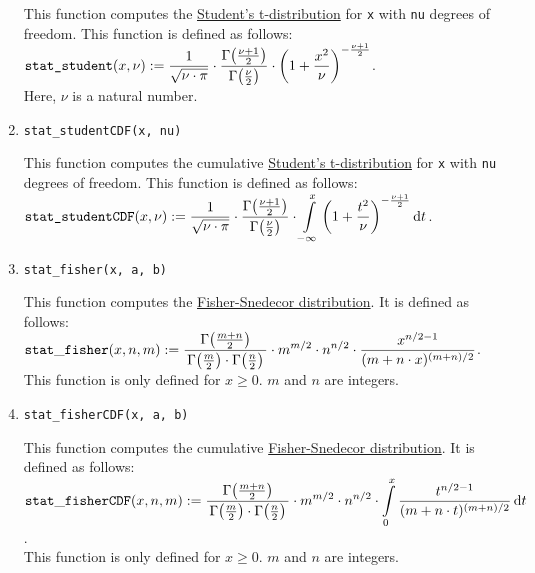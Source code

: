 \begin{enumerate}
			This function computes the 
			\href{https://en.wikipedia.org/wiki/Student%27s_t-distribution}{Student's t-distribution}
			for \texttt{x} with \texttt{nu} degrees of freedom.   This function is defined as follows:
			\\[0.2cm]
			\hspace*{1.3cm}
			$\displaystyle \texttt{stat\_student}(x, \nu) := \frac{1}{\sqrt{\nu\cdot\pi}} \cdot
			\frac{\Gamma\bigl(\frac{\nu+1}{2}\bigr)}{\Gamma\bigl(\frac{\nu}{2}\bigr)} \cdot
			\left(1 + \frac{x^2}{\nu}\right)^{-\frac{\nu+1}{2}}
			$.
			\\[0.2cm]
			Here, $\nu$ is a natural number.
		\item \texttt{stat\_studentCDF(x, nu)}

			This function computes the cumulative 
			\href{https://en.wikipedia.org/wiki/Student%27s_t-distribution}{Student's t-distribution}
			for \texttt{x} with \texttt{nu} degrees of freedom.   This function is defined as follows:
			\\[0.2cm]
			\hspace*{1.3cm}
			$\displaystyle \texttt{stat\_studentCDF}(x, \nu) := \frac{1}{\sqrt{\nu\cdot\pi}} \cdot
			\frac{\Gamma\bigl(\frac{\nu+1}{2}\bigr)}{\Gamma\bigl(\frac{\nu}{2}\bigr)} \cdot
			\int\limits_{-\infty}^{x} \left(1 + \frac{t^2}{\nu}\right)^{-\frac{\nu+1}{2}} \mathrm{d} t
			$.
		\item \texttt{stat\_fisher(x, a, b)}

			This function computes the 
			\href{https://en.wikipedia.org/wiki/F-distribution}{Fisher-Snedecor distribution}.
			It is defined as follows:
			\\[0.2cm]
			\hspace*{1.3cm}
			$\displaystyle \mathtt{stat\_fisher}(x, n, m) :=
			\frac{\Gamma\bigl(\frac{m+n}{2}\bigr)}{\,\Gamma\bigl(\frac{m}{2}\bigr) \cdot \Gamma\bigl(\frac{n}{2}\bigr)\,} 
			 \cdot m^{m/2} \cdot n^{n/2} \cdot \frac{x^{n/2-1}}{(m + n \cdot x)^{(m+n)/2}}
			$.
			\\[0.2cm]
			This function is only defined for $x \geq 0$.  $m$ and $n$ are integers.
		\item \texttt{stat\_fisherCDF(x, a, b)}

			This function computes the cumulative
			\href{https://en.wikipedia.org/wiki/F-distribution}{Fisher-Snedecor distribution}.
			It is defined as follows:
			\\[0.2cm]
			\hspace*{1.3cm}
			$\displaystyle \mathtt{stat\_fisherCDF}(x, n, m) :=
			\frac{\Gamma\bigl(\frac{m+n}{2}\bigr)}{\,\Gamma\bigl(\frac{m}{2}\bigr) \cdot \Gamma\bigl(\frac{n}{2}\bigr)\,} 
			 \cdot m^{m/2} \cdot n^{n/2} \cdot \int\limits_{0}^x \frac{t^{n/2-1}}{(m + n \cdot t)^{(m+n)/2}} \,\mathrm{d}t
			$.
			\\[0.2cm]
			This function is only defined for $x \geq 0$. $m$ and $n$ are integers.
		\end{enumerate}

